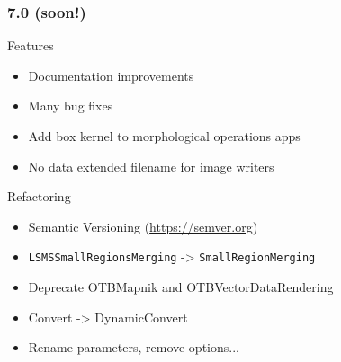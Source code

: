 \begin{frame}
\frametitle{7.0 (soon!)}
\begin{block}{Features}
\begin{itemize}
\item Documentation improvements
\item Many bug fixes
\item Add box kernel to morphological operations apps
\item No data extended filename for image writers
\end{itemize}
\end{block}

\begin{block}{Refactoring}
\begin{itemize}
\item Semantic Versioning (\url{https://semver.org})
\item \texttt{LSMSSmallRegionsMerging} -> \texttt{SmallRegionMerging}
\item Deprecate OTBMapnik and OTBVectorDataRendering
\item Convert -> DynamicConvert
\item Rename parameters, remove options...
\end{itemize}
\end{block}

\end{frame}
